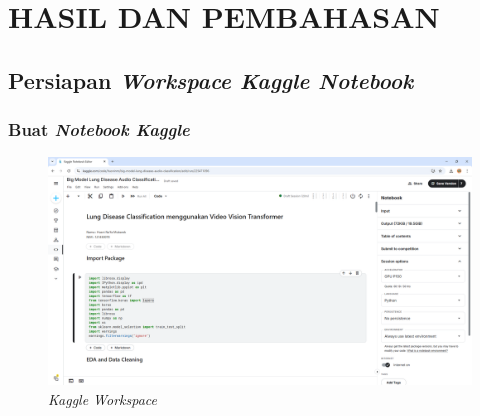 \chapter{HASIL DAN PEMBAHASAN}

\section{Persiapan \textit{Workspace Kaggle Notebook}}
\subsection{Buat \textit{Notebook Kaggle}}
\begin{figure}[H]
    \centering
    \includegraphics[width=1\linewidth]{gambar/Screenshot 2025-03-10 103758.png}
    \caption{\textit{Kaggle Workspace}}
    \label{fig:kaggle_workspace}
\end{figure}
